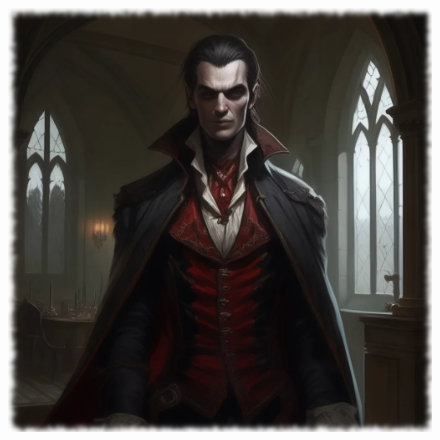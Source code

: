 \begin{figure}[h]
\begin{center}
\includegraphics[scale=0.24]{img/ai-images/vampire.png}
\end{center}
\end{figure}
